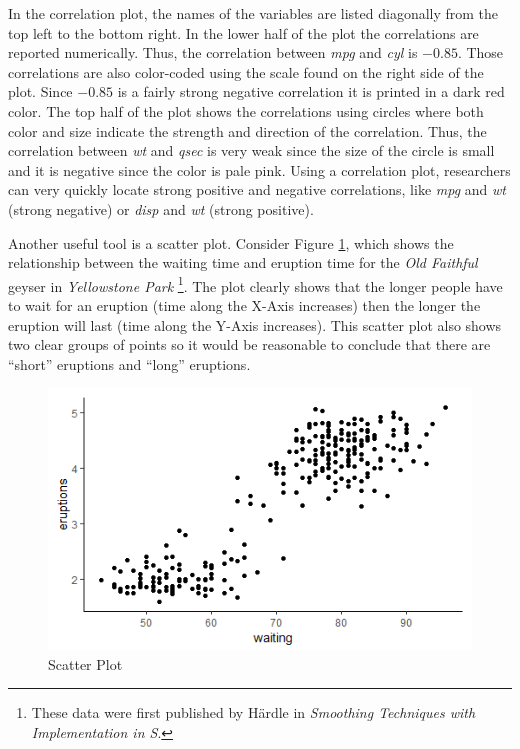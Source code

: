 In the correlation plot, the names of the variables are listed diagonally from the top left to the bottom right. In the lower half of the plot the correlations are reported numerically. Thus, the correlation between \textit{mpg} and \textit{cyl} is $ -0.85 $. Those correlations are also color-coded using the scale found on the right side of the plot. Since $ -0.85 $ is a fairly strong negative correlation it is printed in a dark red color. The top half of the plot shows the correlations using circles where both color and size indicate the strength and direction of the correlation. Thus, the correlation between \textit{wt} and \textit{qsec} is very weak since the size of the circle is small and it is negative since the color is pale pink. Using a correlation plot, researchers can very quickly locate strong positive and negative correlations, like \textit{mpg} and \textit{wt} (strong negative) or \textit{disp} and \textit{wt} (strong positive).

Another useful tool is a scatter plot. Consider Figure \ref{14:fig05}, which shows the relationship between the waiting time and eruption time for the \textit{Old Faithful} geyser in \textit{Yellowstone Park} \footnote{These data were first published by H{\"a}rdle in \textit{Smoothing Techniques with Implementation in S}\cite{hardle2012smoothing}.}. The plot clearly shows that the longer people have to wait for an eruption (time along the X-Axis increases) then the longer the eruption will last (time along the Y-Axis increases). This scatter plot also shows two clear groups of points so it would be reasonable to conclude that there are ``short'' eruptions and ``long'' eruptions.

\begin{figure}[H]
	\centering
	\includegraphics[width=\maxwidth{.95\linewidth}]{gfx/14-Faithful}
	\caption{Scatter Plot}
	\label{14:fig05}
\end{figure}

